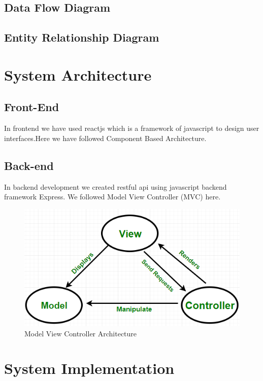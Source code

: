 \documentclass[10pt]{article}
\begin{document}
\subsection{Data Flow Diagram}

\subsection{Entity Relationship Diagram}

\section{System Architecture}

\subsection{Front-End}
In frontend we have used reactjs which is a framework of javascript to design user interfaces.Here we have followed Component Based Architecture.

\subsection{Back-end}

In backend development we created restful api using javascript backend framework Express. We followed Model View Controller (MVC) here.

\begin{figure}[H]
  \centering
  \centerline{\includegraphics[width=\textwidth]{diagram/mvc.png}}
  \caption{Model View Controller Architecture}
  \label{fig}
\end{figure}


\section{System Implementation}
\end{document}
